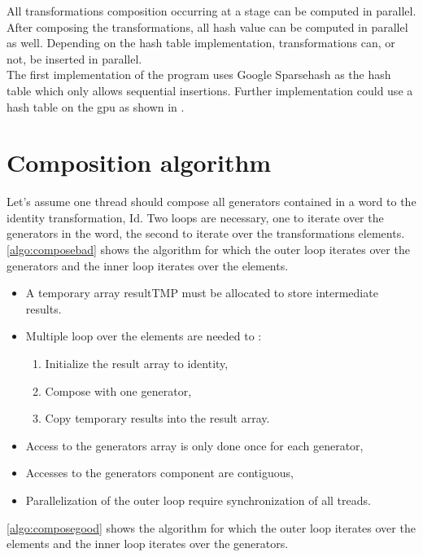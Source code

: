 {All transformations composition occurring at a stage can be computed in parallel. After composing the transformations, all hash value can be computed in parallel as well. Depending on the hash table implementation, transformations can, or not, be inserted in parallel.\\
The first implementation of the program uses Google Sparsehash as the hash table which only allows sequential insertions. Further implementation could use a hash table on the \gls{gpu} as shown in \cite{wen2011gpu}.


\section{Composition algorithm}
Let's assume one thread should compose all generators contained in a word to the identity transformation, Id. Two loops are necessary, one to iterate over the generators in the word, the second to iterate over the transformations elements.
\autoref{algo:composebad} shows the algorithm for which the outer loop iterates over the generators and the inner loop iterates over the elements.
\begin{itemize}
\item A temporary array resultTMP must be allocated to store intermediate results.
\item Multiple loop over the elements are needed to :
\begin{enumerate}
 \item Initialize the result array to identity,
 \item Compose with one generator,
 \item Copy temporary results into the result array.
 \end{enumerate}
\item Access to the generators array is only done once for each generator,
 \item Accesses to the generators component are contiguous,
 \item Parallelization of the outer loop require synchronization of all treads.
\end{itemize}
\autoref{algo:composegood} shows the algorithm for which the outer loop iterates over the elements and the inner loop iterates over the generators.
\begin{itemize}

\end{itemize}}
